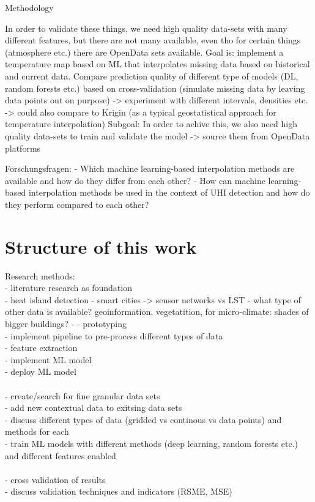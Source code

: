 Methodology

In order to validate these things, we need high quality data-sets with many different features, but there are not many available, even tho for certain things (atmosphere etc.) there are OpenData sets available.
Goal is: implement a temperature map based on ML that interpolates missing data based on historical and current data.
Compare prediction quality of different type of models (DL, random forests etc.) based on cross-validation (simulate missing data by leaving data points out on purpose) -> experiment with different intervals, densities etc. -> could also compare to Krigin (as a typical geostatistical approach for temperature interpolation)
Subgoal: In order to achive this, we also need high quality data-sets to train and validate the model -> source them from OpenData platforms

Forschungsfragen:
- Which machine learning-based interpolation methods are available and how do they differ from each other?
- How can machine learning-based interpolation methods be used in the context of UHI detection and how do they perform compared to each other?

\section{Structure of this work}

Research methods:\\
- literature research as foundation\\
    - heat island detection
        - smart cities -> sensor networks vs LST
        - what type of other data is available? geoinformation, vegetatition, for micro-climate: shades of bigger buildings?
    - 
- prototyping\\
    - implement pipeline to pre-process different types of data\\
    - feature extraction\\
    - implement ML model\\
    - deploy ML model\\
\\
- create/search for fine granular data sets\\
    - add new contextual data to exitsing data sets\\
    - discuss different types of data (gridded vs continous vs data points) and methods for each
\\
- train ML models with different methods (deep learning, random forests etc.) and different features enabled\\
\\
- cross validation of results\\
    - discuss validation techniques and indicators (RSME, MSE)\\


